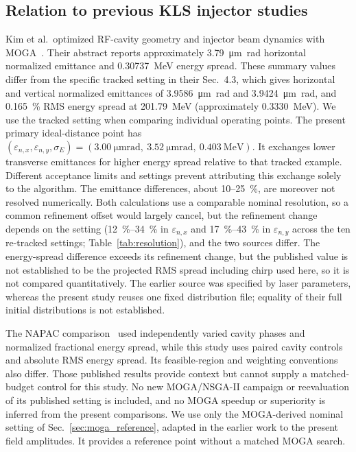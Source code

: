 \documentclass[aps,prab,reprint,superscriptaddress,amsmath,amssymb,floatfix]{revtex4-2}
\newcommand{\enx}{\varepsilon_{n,x}}
\newcommand{\eny}{\varepsilon_{n,y}}
\begin{document}
\subsection{Relation to previous KLS injector studies}
\label{sec:previous_kls}
Kim et al.\ optimized RF-cavity geometry and injector beam dynamics with
MOGA~\cite{Kim2024KLSMOGA}. Their abstract reports approximately
\SI{3.79}{\micro\metre\radian} horizontal normalized emittance and
\SI{0.30737}{\mega\electronvolt} energy spread. These summary values differ from the
specific tracked setting in their Sec.~4.3, which gives horizontal and vertical normalized
emittances of \SI{3.9586}{\micro\metre\radian} and \SI{3.9424}{\micro\metre\radian},
and \SI{0.165}{\percent} RMS energy spread at \SI{201.79}{\mega\electronvolt}
(approximately \SI{0.3330}{\mega\electronvolt}). We use the tracked setting when comparing
individual operating points. The present primary ideal-distance point has
$(\enx,\eny,\sigma_E)=(\SI{3.00}{\micro\metre\radian},\
\SI{3.52}{\micro\metre\radian},\ \SI{0.403}{\mega\electronvolt})$.
It exchanges lower transverse emittances for higher energy spread relative to that tracked
example. Different acceptance limits and settings prevent attributing this exchange solely to
the algorithm. The emittance differences, about 10--\SI{25}{\percent}, are moreover not resolved
numerically. Both calculations use a comparable nominal resolution, so a common refinement offset
would largely cancel, but the refinement change depends on the setting
(\SIrange{12}{34}{\percent} in $\enx$ and \SIrange{17}{43}{\percent} in $\eny$ across the
ten re-tracked settings; Table~\ref{tab:resolution}), and the two sources differ. The
energy-spread difference exceeds its refinement change, but the published value is not
established to be the projected RMS spread including chirp used here, so it is not compared
quantitatively. The earlier source was specified by laser parameters, whereas the present study
reuses one fixed distribution file; equality of their full initial distributions is not established.

The NAPAC comparison~\cite{Park2025NAPAC} used independently varied cavity phases and normalized
fractional energy spread, while this study uses paired cavity controls and absolute RMS energy
spread. Its feasible-region and weighting conventions also differ. Those published results
provide context but cannot supply a matched-budget control for this study. No new MOGA/NSGA-II
campaign or reevaluation of its published setting is included, and no MOGA speedup or
superiority is inferred from the present comparisons. We use only the MOGA-derived nominal
setting of Sec.~\ref{sec:moga_reference}, adapted in the earlier work to the present field
amplitudes. It provides a reference point without a matched MOGA search.
\end{document}
